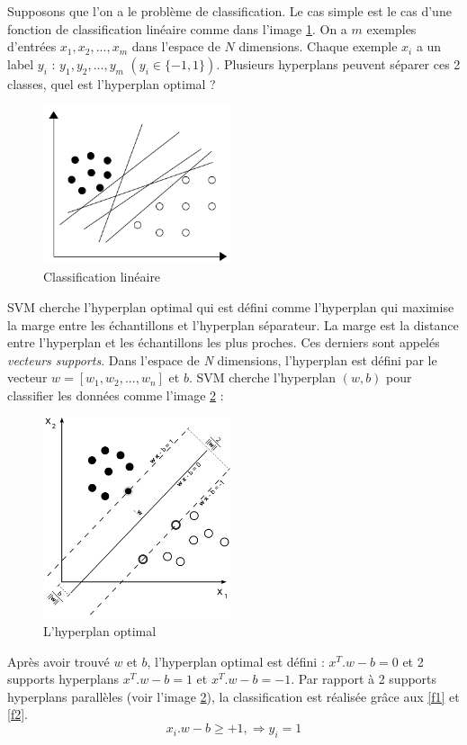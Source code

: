 Supposons que l'on a le problème de classification. Le cas simple est le cas d'une fonction de classification linéaire comme dans l'image \ref{slines}. On a $m$ exemples d'entrées $x_1, x_2, ..., x_m$ dans l'espace de $N$ dimensions. Chaque exemple $x_i$ a un label $y_i$ : $y_1, y_2, ..., y_m$ $(y_i \in \{-1,1\})$. Plusieurs hyperplans peuvent séparer ces 2 classes, quel est l'hyperplan optimal ?

\begin{figure}[ht!]
\centering
\includegraphics[width=55mm]{images/separating_lines}
\caption{Classification linéaire}
\label{slines}
\end{figure}

SVM cherche l'hyperplan optimal qui est défini comme l'hyperplan qui maximise la marge entre les échantillons et l'hyperplan séparateur. La marge est la distance entre l'hyperplan et les échantillons les plus proches. Ces derniers sont appelés \textit{vecteurs supports}. Dans l'espace de \textit{N} dimensions, l'hyperplan est défini par le vecteur $w=[w_1,w_2,...,w_n]$ et $b$. SVM cherche l'hyperplan $(w, b)$ pour classifier les données comme l'image \ref{max_margin} :

\begin{figure}[ht!]
\centering
\includegraphics[width=55mm]{images/margin}
\caption{L'hyperplan optimal}
\label{max_margin}
\end{figure}

Après avoir trouvé $w$ et $b$, l'hyperplan optimal est défini : $x^T.w - b = 0$ et 2 supports hyperplans $x^T.w - b = 1$ et $x^T.w - b = -1$. Par rapport à 2 supports hyperplans parallèles (voir l'image \ref{max_margin}), la classification est réalisée grâce aux \ref{f1} et \ref{f2}.
\begin{equation}
x_i.w - b \geq +1, \Rightarrow y_i = 1
\label{f1}
\end{equation}

